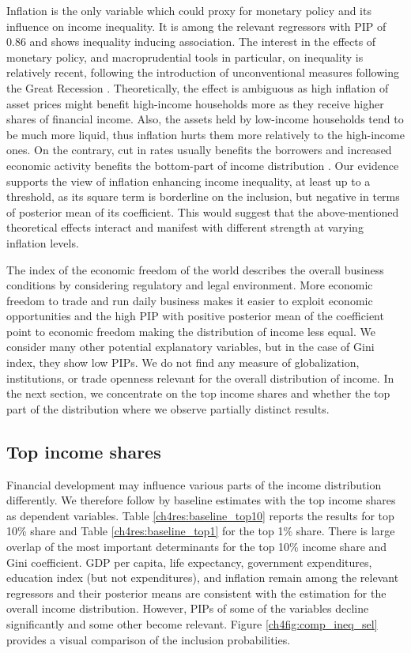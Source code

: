 \begin{refsection}
Inflation is the only variable which could proxy for monetary policy and its influence on income inequality. It is among the relevant regressors with \ac{PIP} of 0.86 and shows inequality inducing association. The interest in the effects of monetary policy, and macroprudential tools in particular, on inequality is relatively recent, following the introduction of unconventional measures following the Great Recession \parencite{frost2018macroprudential}. Theoretically, the effect is ambiguous as high inflation of asset prices might benefit high-income households more as they receive higher shares of financial income. Also, the assets held by low-income households tend to be much more liquid, thus inflation hurts them more relatively to the high-income ones. On the contrary, cut in rates usually benefits the borrowers and increased economic activity benefits the bottom-part of income distribution \parencite{furceri2019robust}. Our evidence supports the view of inflation enhancing income inequality, at least up to a threshold, as its square term is borderline on the inclusion, but negative in terms of posterior mean of its coefficient. This would suggest that the above-mentioned theoretical effects interact and manifest with different strength at varying inflation levels.

The index of the economic freedom of the world describes the overall business conditions by considering regulatory and legal environment. More economic freedom to trade and run daily business makes it easier to exploit economic opportunities and the high \ac{PIP} with positive posterior mean of the coefficient point to economic freedom making the distribution of income less equal. We consider many other potential explanatory variables, but in the case of Gini index, they show low \acp{PIP}. We do not find any measure of globalization, institutions, or trade openness relevant for the overall distribution of income. In the next section, we concentrate on the top income shares and whether the top part of the distribution where we observe partially distinct results.

\subsection{Top income shares}
Financial development may influence various parts of the income distribution differently. We therefore follow by baseline estimates with the top income shares as dependent variables. Table \ref{ch4res:baseline_top10} reports the results for top 10\% share and Table \ref{ch4res:baseline_top1} for the top 1\% share. There is large overlap of the most important determinants for the top 10\% income share and Gini coefficient. GDP per capita, life expectancy, government expenditures, education index (but not expenditures), and inflation remain among the relevant regressors and their posterior means are consistent with the estimation for the overall income distribution. However, \acp{PIP} of some of the variables decline significantly and some other become relevant. Figure \ref{ch4fig:comp_ineq_sel} provides a visual comparison of the inclusion probabilities.


\end{refsection}
